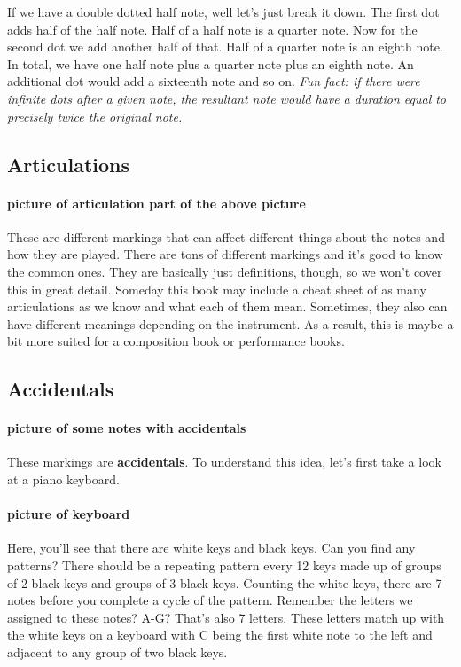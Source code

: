\documentclass[../OpenAppliedMusicTheory.tex]{subfiles}
\begin{document}
        If we have a double dotted half note, well let's just break it down. The first dot adds half of the half note. Half of a half note is a quarter note. Now for the second dot we add another half of that. Half of a quarter note is an eighth note. In total, we have one half note plus a quarter note plus an eighth note. An additional dot would add a sixteenth note and so on. \emph{Fun fact: if there were infinite dots after a given note, the resultant note would have a duration equal to precisely twice the original note.}

        \subsection{Articulations}

        \paragraph{picture of articulation part of the above picture}
        These are different markings that can affect different things about the notes and how they are played. There are tons of different markings and it's good to know the common ones. They are basically just definitions, though, so we won't cover this in great detail. Someday this book may include a cheat sheet of as many articulations as we know and what each of them mean. %
        Sometimes, they also can have different meanings depending on the instrument. As a result, this is maybe a bit more suited for a composition book or performance books.

        \subsection{Accidentals}
        \paragraph{picture of some notes with accidentals}
        These markings are \textbf{accidentals}. To understand this idea, let's first take a look at a piano keyboard.

        \paragraph{picture of keyboard}
        Here, you'll see that there are white keys and black keys. Can you find any patterns? There should be a repeating pattern every 12 keys made up of groups of 2 black keys and groups of 3 black keys. Counting the white keys, there are 7 notes before you complete a cycle of the pattern. Remember the letters we assigned to these notes? A-G? That's also 7 letters. These letters match up with the white keys on a keyboard with C being the first white note to the left and adjacent to any group of two black keys. 
\end{document}
